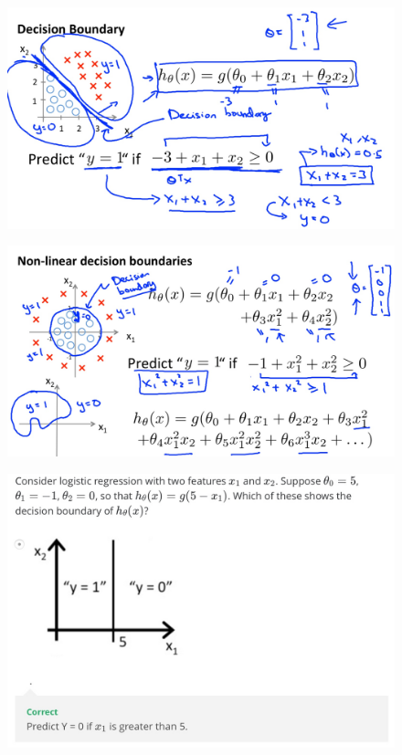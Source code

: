 \documentclass[12pt, A4,onecolumn]{article} %
\begin{document}
\begin{figure}[H]
	\centering
	\includegraphics[width=1\textwidth]{./Imagenes/decBound4}
\end{figure}

\begin{figure}[H]
	\centering
	\includegraphics[width=1\textwidth]{./Imagenes/decBound5}
\end{figure}
\begin{figure}[H]
	\centering
	\includegraphics[width=1\textwidth]{./Imagenes/testDecbound}
\end{figure}
\end{document}
